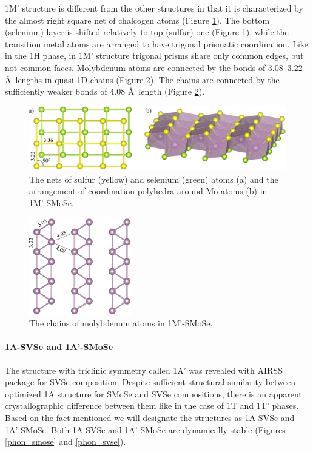 \documentclass[a4paperm]{article}
\begin{document}
1M' structure is different from the other structures in that it is characterized by the almost right square net of chalcogen atoms (Figure \ref{H-hor}).
The bottom (selenium) layer is shifted relatively to top (sulfur) one (Figure \ref{H-hor}), while the transition metal atoms are arranged to have trigonal prismatic coordination.
Like in the 1H phase, in 1M' structure trigonal prisms share only common edges, but not common faces.
Molybdenum atoms are connected by the bonds of 3.08--3.22 \AA\ lengths in quasi-1D chains (Figure \ref{H-hor_Mo}).
The chains are connected by the sufficiently weaker bonds of 4.08 \AA\ length (Figure \ref{H-hor_Mo}).


\begin{figure}[H]
	\includegraphics[width=\textwidth]{H-hor.png}
	\caption{The nets of sulfur (yellow) and selenium (green) atoms (a) and the arrangement of coordination polyhedra around Mo atoms (b) in 1M'-SMoSe.}
	\label{H-hor}
\end{figure} 


\begin{figure}[H]
	\includegraphics[width=0.4\textwidth]{H-hor_Mo.png}
	\caption{The chains of molybdenum atoms in 1M'-SMoSe.}
	\label{H-hor_Mo}
\end{figure} 


\paragraph{1A-SVSe and 1A'-SMoSe}
The structure with triclinic symmetry called 1A' was revealed with AIRSS package for SVSe composition.
Despite sufficient structural similarity between optimized 1A structure for SMoSe and SVSe compositions, there is an apparent crystallographic difference between them like in the case of 1T and 1T' phases.
Based on the fact mentioned we will designate the structures as 1A-SVSe and 1A'-SMoSe.
Both 1A-SVSe and 1A'-SMoSe are dynamically stable (Figures \ref{phon_smose} and \ref{phon_svse}).
\end{document}
